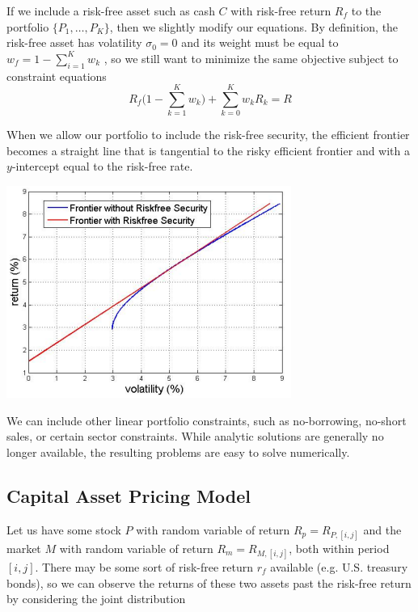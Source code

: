 \documentclass{article}
\begin{document}
    \begin{example}
      If we include a risk-free asset such as cash $C$ with risk-free return $R_f$ to the portfolio $\{P_1, \ldots, P_K\}$, then we slightly modify our equations. By definition, the risk-free asset has volatility $\sigma_0 = 0$ and its weight must be equal to $w_f = 1 - \sum_{i=1}^K w_k$
      , so we still want to minimize the same objective subject to constraint equations 
      \begin{equation}
        R_f \bigg( 1 - \sum_{k=1}^K w_k \bigg) + \sum_{k=0}^K w_k R_k = R
      \end{equation}

      When we allow our portfolio to include the risk-free security, the efficient frontier becomes a straight line that is tangential to the risky efficient frontier and with a $y$-intercept equal to the risk-free rate. 
      \begin{center}
        \includegraphics[scale=0.65]{img/Frontier_with_Risk_Free_Sec.png}
      \end{center}
      We can include other linear portfolio constraints, such as no-borrowing, no-short sales, or certain sector constraints. While analytic solutions are generally no longer available, the resulting problems are easy to solve numerically. 
    \end{example}

  \subsection{Capital Asset Pricing Model}

    Let us have some stock $P$ with random variable of return $R_p = R_{P, [i, j]}$ and the market $M$ with random variable of return $R_m = R_{M, [i, j]}$, both within period $[i, j]$. There may be some sort of risk-free return $r_f$ available (e.g. U.S. treasury bonds), so we can observe the returns of these two assets past the risk-free return by considering the joint distribution 
\end{document}
